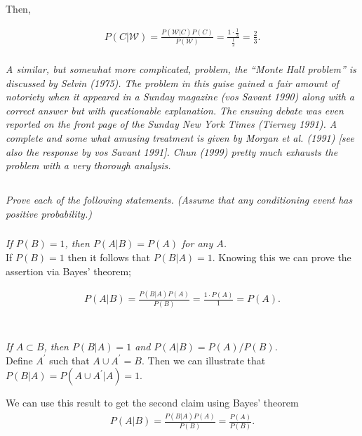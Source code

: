\documentclass[12pt]{amsart}
\begin{document}
	Then,
	
	\begin{align*}
		P(C|\mathcal W) = \frac{ P(\mathcal W|C) P(C)}{P(\mathcal W)}
		= \frac{1\cdot\frac{1}{3}}{\frac{1}{2}}
		= \frac{2}{3}.
	\end{align*} \\
	
\textit{A similar, but somewhat more complicated, problem, the “Monte Hall problem” is discussed by Selvin (1975). 
	The problem in this guise gained a fair amount of notoriety when it appeared in a Sunday magazine (vos Savant 1990) along with a correct
	answer but with questionable explanation. The ensuing debate was even reported on the front page of the Sunday New York Times (Tierney 1991). 
	A complete and some what amusing treatment is given by Morgan et al. (1991) [see also the response by vos Savant 1991]. 
	Chun (1999) pretty much exhausts the problem with a very thorough analysis.} \clearpage

\subsection{} %
\textit{Prove each of the following statements. (Assume that any conditioning event has positive probability.)}
	\subsubsection{} \textit{If \(P(B) = 1\), then \(P(A|B) = P(A)\) for any \(A\).} \\
	
		If \(P(B) = 1\) then it follows that \(P(B|A) = 1\). Knowing this we can prove the assertion via
		Bayes' theorem;
		
		\begin{align*}
			P(A|B) = \frac{P(B|A)P(A)}{P(B)} = \frac{1\cdot P(A)}{1} = P(A).
		\end{align*} \\
	
	
	\subsubsection{} \textit{If \(A \subset B\), then \(P(B|A) = 1\) and \(P(A|B) = P(A)/P(B)\).} \\
	
		Define \(A^\prime\) such that \(A\cup A^\prime = B\).
		Then we can illustrate that \(P(B|A) = P(A\cup A^\prime|A) = 1\).
	
		We can use this result to get the second claim using Bayes' theorem
		\begin{align*}
			P(A|B) 
			= \frac{P(B|A)P(A)}{P(B)}
			= \frac{P(A)}{P(B)}.
		\end{align*} \\
	
\end{document}
